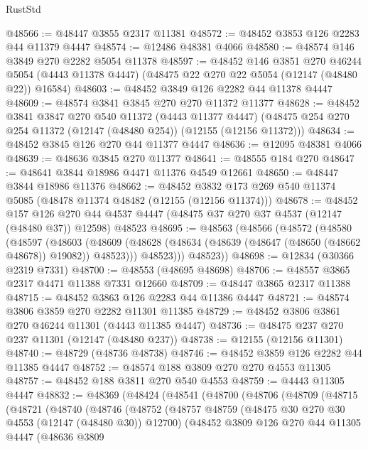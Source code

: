 \begin{lexlean}{RustStd}
\begin{coremodule}
@48566 := @48447 @3855 @2317 @11381
@48572 := @48452 @3853 @126 @2283 @44 @11379 @4447
@48574 := @12486 @48381 @4066
@48580 := @48574 @146 @3849 @270 @2282 @5054 @11378
@48597 := @48452
    @146
    @3851
    @270
    @46244
    @5054
    (@4443 @11378 @4447)
    (@48475 @22 @270 @22 @5054 (@12147 (@48480 @22)) @16584)
@48603 := @48452 @3849 @126 @2282 @44 @11378 @4447
@48609 := @48574 @3841 @3845 @270 @270 @11372 @11377
@48628 := @48452
    @3841
    @3847
    @270
    @540
    @11372
    (@4443 @11377 @4447)
    (@48475 @254 @270 @254 @11372 (@12147 (@48480 @254)) (@12155 (@12156 @11372)))
@48634 := @48452 @3845 @126 @270 @44 @11377 @4447
@48636 := @12095 @48381 @4066
@48639 := @48636 @3845 @270 @11377
@48641 := @48555 @184 @270
@48647 := @48641 @3844 @18986 @4471 @11376 @4549 @12661
@48650 := @48447 @3844 @18986 @11376
@48662 := @48452 @3832 @173 @269 @540 @11374 @5085 (@48478 @11374 @48482 (@12155 (@12156 @11374)))
@48678 := @48452
    @157
    @126
    @270
    @44
    @4537
    @4447
    (@48475 @37 @270 @37 @4537 (@12147 (@48480 @37)) @12598)
    @48523
@48695 := @48563
    (@48566
      (@48572
        (@48580
          (@48597
            (@48603
              (@48609 (@48628 (@48634 (@48639 (@48647 (@48650 (@48662 @48678)) @19082)) @48523)))
              @48523)))
        @48523))
@48698 := @12834 (@30366 @2319 @7331)
@48700 := @48553 (@48695 @48698)
@48706 := @48557 @3865 @2317 @4471 @11388 @7331 @12660
@48709 := @48447 @3865 @2317 @11388
@48715 := @48452 @3863 @126 @2283 @44 @11386 @4447
@48721 := @48574 @3806 @3859 @270 @2282 @11301 @11385
@48729 := @48452 @3806 @3861 @270 @46244 @11301 (@4443 @11385 @4447)
@48736 := @48475 @237 @270 @237 @11301 (@12147 (@48480 @237))
@48738 := @12155 (@12156 @11301)
@48740 := @48729 (@48736 @48738)
@48746 := @48452 @3859 @126 @2282 @44 @11385 @4447
@48752 := @48574 @188 @3809 @270 @270 @4553 @11305
@48757 := @48452 @188 @3811 @270 @540 @4553
@48759 := @4443 @11305 @4447
@48832 := @48369
    (@48424
      (@48541
        (@48700
          (@48706
            (@48709
              (@48715
                (@48721
                  (@48740
                    (@48746
                      (@48752
                        (@48757
                          @48759
                          (@48475 @30 @270 @30 @4553 (@12147 (@48480 @30)) @12700)
                          (@48452
                            @3809
                            @126
                            @270
                            @44
                            @11305
                            @4447
                            (@48636
                              @3809

\end{coremodule}
\end{lexlean}
